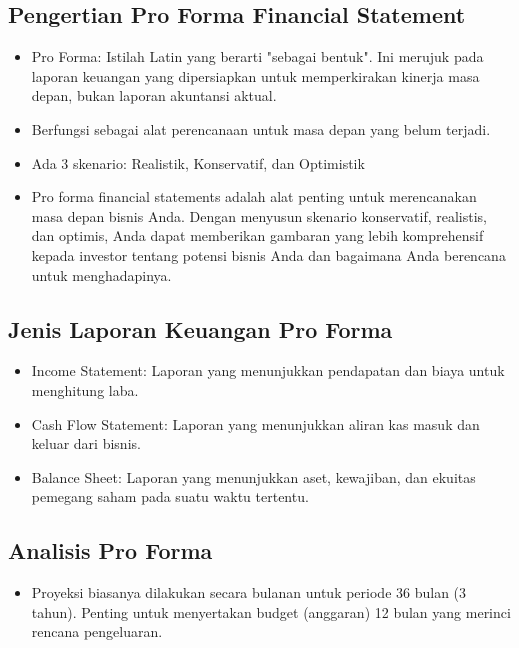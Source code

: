 \documentclass{article}
\begin{document}
\subsection{Pengertian Pro Forma Financial Statement}
\begin{itemize}
    \item Pro Forma: Istilah Latin yang berarti "sebagai bentuk". Ini merujuk pada laporan keuangan yang dipersiapkan untuk memperkirakan kinerja masa depan, bukan laporan akuntansi aktual.
    \item Berfungsi sebagai alat perencanaan untuk masa depan yang belum terjadi.
    \item Ada 3 skenario: Realistik, Konservatif, dan Optimistik
    \item Pro forma financial statements adalah alat penting untuk merencanakan masa depan bisnis Anda. Dengan menyusun skenario konservatif, realistis, dan optimis, Anda dapat memberikan gambaran yang lebih komprehensif kepada investor tentang potensi bisnis Anda dan bagaimana Anda berencana untuk menghadapinya.
\end{itemize}

\subsection{Jenis Laporan Keuangan Pro Forma}
\begin{itemize}
    \item Income Statement: Laporan yang menunjukkan pendapatan dan biaya untuk menghitung laba.
    \item Cash Flow Statement: Laporan yang menunjukkan aliran kas masuk dan keluar dari bisnis.
    \item Balance Sheet: Laporan yang menunjukkan aset, kewajiban, dan ekuitas pemegang saham pada suatu waktu tertentu.
\end{itemize}

\subsection{Analisis Pro Forma}
\begin{itemize}
    \item Proyeksi biasanya dilakukan secara bulanan untuk periode 36 bulan (3 tahun).
          Penting untuk menyertakan budget (anggaran) 12 bulan yang merinci rencana pengeluaran.
\end{itemize}
\end{document}
